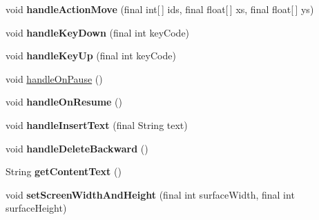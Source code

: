 \begin{DoxyCompactItemize}
\item 
\mbox{\label{classorg_1_1cocos2dx_1_1lib_1_1Cocos2dxRenderer_ab72692286d407f725618889cdf42c357}} 
void {\bfseries handle\+Action\+Move} (final int\mbox{[}$\,$\mbox{]} ids, final float\mbox{[}$\,$\mbox{]} xs, final float\mbox{[}$\,$\mbox{]} ys)
\item 
\mbox{\label{classorg_1_1cocos2dx_1_1lib_1_1Cocos2dxRenderer_a218167a1b5bada855019b941e3b69e9c}} 
void {\bfseries handle\+Key\+Down} (final int key\+Code)
\item 
\mbox{\label{classorg_1_1cocos2dx_1_1lib_1_1Cocos2dxRenderer_a32bcc9f43575cf394f5dcc0ac1f1ed4e}} 
void {\bfseries handle\+Key\+Up} (final int key\+Code)
\item 
void \hyperlink{classorg_1_1cocos2dx_1_1lib_1_1Cocos2dxRenderer_a253bb3076421742699afad4404a27dcd}{handle\+On\+Pause} ()
\item 
\mbox{\label{classorg_1_1cocos2dx_1_1lib_1_1Cocos2dxRenderer_af4265fd8b49921ea615c126eac200a1d}} 
void {\bfseries handle\+On\+Resume} ()
\item 
\mbox{\label{classorg_1_1cocos2dx_1_1lib_1_1Cocos2dxRenderer_a1a72056de6c7598ed9b157c707344e97}} 
void {\bfseries handle\+Insert\+Text} (final String text)
\item 
\mbox{\label{classorg_1_1cocos2dx_1_1lib_1_1Cocos2dxRenderer_a0864ebd6fed58ccd2b0a37b59a1171b1}} 
void {\bfseries handle\+Delete\+Backward} ()
\item 
\mbox{\label{classorg_1_1cocos2dx_1_1lib_1_1Cocos2dxRenderer_a31fb8e615dd24e51d1651e6112cadc7e}} 
String {\bfseries get\+Content\+Text} ()
\item 
\mbox{\label{classorg_1_1cocos2dx_1_1lib_1_1Cocos2dxRenderer_ade1075a5c025f8c2851f27cc1f35d3a1}} 
void {\bfseries set\+Screen\+Width\+And\+Height} (final int surface\+Width, final int surface\+Height)

\end{DoxyCompactItemize}
